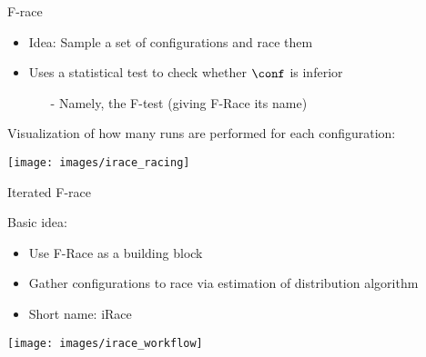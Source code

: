 \begin{frame}[c]{F-race }

\begin{itemize}
  \item Idea: Sample a set of configurations and race them
  \item Uses a statistical test to check whether $\conf$ is inferior
  \begin{itemize}
  	\item[-] Namely, the F-test (giving F-Race its name)
  \end{itemize}
\end{itemize}

\pause
\bigskip

Visualization of how many runs are performed for each configuration:
\begin{center}
\texttt{[image: images/irace\_racing]}\\
\end{center}

\end{frame}

\begin{frame}[c,fragile]{Iterated F-race~}

Basic idea:
\begin{itemize}
	\item Use F-Race as a building block
	\item Gather configurations to race via estimation of distribution algorithm
	\item Short name: iRace
\end{itemize}

\begin{center}
\texttt{[image: images/irace\_workflow]}\\
\end{center}

\end{frame}


